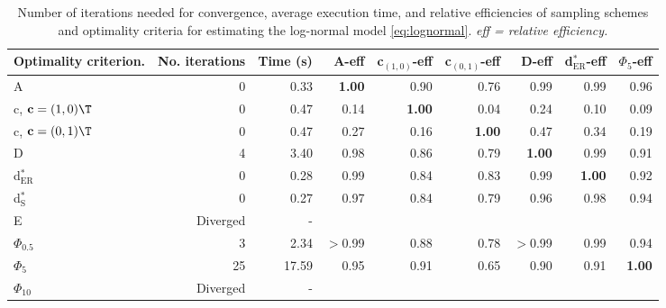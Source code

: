 \begin{table}[htb!]
\centering
\caption{Number of iterations needed for convergence, average execution time, and relative efficiencies of sampling schemes and optimality criteria for estimating the log-normal model \eqref{eq:lognormal}. \textit{eff = relative efficiency.}} 
\label{tab:baseline_impact_speed}
\begin{tabular}{lrrrrrrrr}
 Optimality criterion. & No. iterations & Time (s) & A-eff & c$_{(1,0)}$-eff & c$_{(0,1)}$-eff & D-eff & d$^*_{\mathrm{ER}}$-eff & $\Phi_5$-eff \\ 
  \hline
A & 0 & 0.33 & \textbf{1.00} & 0.90 & 0.76 & 0.99 & 0.99 & 0.96 \\ 
  c, $\mathbf{c} = (1,0)\T$ & 0 & 0.47 & 0.14 & \textbf{1.00} & 0.04 & 0.24 & 0.10 & 0.09 \\ 
  c, $\mathbf{c} = (0,1)\T$ & 0 & 0.47 & 0.27 & 0.16 & \textbf{1.00} & 0.47 & 0.34 & 0.19 \\ 
  D & 4 & 3.40 & 0.98 & 0.86 & 0.79 & \textbf{1.00} & 0.99 & 0.91 \\ 
  d$^*_{\mathrm{ER}}$ & 0 & 0.28 & 0.99 & 0.84 & 0.83 & 0.99 & \textbf{1.00} & 0.92 \\ 
  d$^*_{\mathrm{S}}$ & 0 & 0.27 & 0.97 & 0.84 & 0.79 & 0.96 & 0.98 & 0.94 \\ 
  E & Diverged & - &  &  &  &  &  &  \\ 
  $\Phi_{0.5}$ & 3 & 2.34 & $>$0.99 & 0.88 & 0.78 & $>$0.99 & 0.99 & 0.94 \\ 
  $\Phi_5$ & 25 & 17.59 & 0.95 & 0.91 & 0.65 & 0.90 & 0.91 & \textbf{1.00} \\ 
  $\Phi_{10}$ & Diverged & - &  &  &  &  &  &  \\ 
   \hline
\end{tabular}
\end{table}
